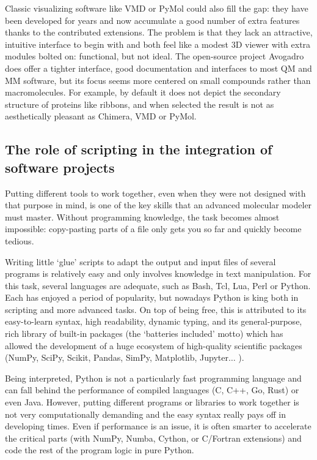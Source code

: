 Classic visualizing software like VMD or PyMol could also fill the gap: they have been developed for years and now accumulate a good number of extra features thanks to the contributed extensions. The problem is that they lack an attractive, intuitive interface to begin with and both feel like a modest 3D viewer with extra modules bolted on: functional, but not ideal. The open-source project Avogadro does offer a tighter interface, good documentation and interfaces to most QM and MM software, but its focus seems more centered on small compounds rather than macromolecules. For example, by default it does not depict the secondary structure of proteins like ribbons, and when selected the result is not as aesthetically pleasant as Chimera, VMD or PyMol.





\subsection{The role of scripting in the integration of software projects}

Putting different tools to work together, even when they were not designed with that purpose in mind, is one of the key skills that an advanced molecular modeler must master. Without programming knowledge, the task becomes almost impossible: copy-pasting parts of a file only gets you so far and quickly become tedious.

Writing little ‘glue’ scripts to adapt the output and input files of several programs is relatively easy and only involves knowledge in text manipulation. For this task, several languages are adequate, such as Bash, Tcl, Lua, Perl or Python. Each has enjoyed a period of popularity, but nowadays Python is king both in scripting and more advanced tasks.\cite{pythonpaypal} On top of being free, this is attributed to its easy-to-learn syntax, high readability, dynamic typing, and its general-purpose, rich library of built-in packages (the ‘batteries included’ motto) which has allowed the development of a huge ecosystem of high-quality scientific packages (NumPy, SciPy, Scikit, Pandas, SimPy, Matplotlib, Jupyter$ \ldots $ ).

Being interpreted, Python is not a particularly fast programming language and can fall behind the performance of compiled languages (C, C++, Go, Rust) or even Java. However, putting different programs or libraries to work together is not very computationally demanding and the easy syntax really pays off in developing times. Even if performance is an issue, it is often smarter to accelerate the critical parts (with NumPy,\cite{numpy} Numba,\cite{numba} Cython,\cite{cython} or C/Fortran extensions) and code the rest of the program logic in pure Python.

